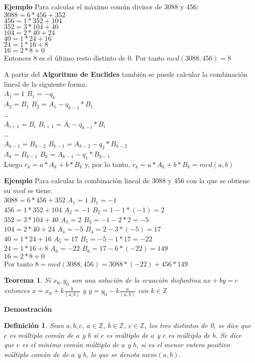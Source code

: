 \documentclass[a4paper,1pt]{report}
\newtheorem*{teo}{Teorema}
\newtheorem*{dfn}{Definición}
\begin{document}
\textbf{Ejemplo}
Para calcular el máximo común divisor de 3088 y 456:\\
$3088=6*456+352$\\
$456=1*352+104$\\
$352=3*104+40$\\
$104=2*40+24$\\
$40=1*24+16$\\
$24=1*16+8$\\
$16=2*8 + 0$\\
Entonces 8 es el último resto distinto de 0. Por tanto $mcd(3088,456)=8$

A partir del \textbf{Algoritmo de Euclides} también se puede calcular la combinación lineal de la siguiente forma:\\
$A_1=1$ $B_1=-q_k$\\
$A_2=B_1$ $B_2=A_1-q_{k-1}*B_1$\\
\dots\\
$A_{i+1}=B_i$ $B_{i+1}=A_i-q_{k-i}*B_i$\\
\dots\\
$A_{k-1}=B_{k-2}$ $B_{k-1}=A_{k-2}-q_2*B_{k-2}$\\
$A_{k}=B_{k-1}$ $B_{k}=A_{k-1}-q_1*B_{k-1}$\\
Luego $r_k=a*A_k+b*B_k$ y, por lo tanto, $r_k=a*A_k+b*B_k=mcd(a,b)$

\textbf{Ejemplo}
Para calcular la combinación lineal de 3088 y 456 con la que se obtiene su $mcd$ se tiene:\\
$3088=6*456+352$ $A_1=1$ $B_1=-1$\\
$456=1*352+104$ $A_2=-1$ $B_2=1-1*(-1)=2$\\
$352=3*104+40$ $A_3=2$ $B_3=-1-2*2=-5$\\
$104=2*40+24$ $A_4=-5$ $B_4=2-3*(-5)=17$\\
$40=1*24+16$ $A_5=17$ $B_5=-5-1*17=-22$\\
$24=1*16+8$ $A_6=-22$ $B_6=17-6*(-22)=149$\\
$16=2*8 + 0$\\
Por tanto $8=mcd(3088,456)=3088*(-22)+456*149$

\begin{teo}
 Si $x_0,y_0$ son una solución de la ecuación diofantina $ax+by=c$ entonces 
 $x=x_0+k\frac{b}{(a,b)}$ y $y=y_0-k\frac{a}{(a,b)}$ con $k\in\mathbb{Z}$
\end{teo}

\textbf{Demostración}

\begin{dfn}
 Sean $a,b,c$, $a\in\mathbb{Z}$, $b\in\mathbb{Z}$, $c\in\mathbb{Z}$, los tres distintos de 0, se dice que $c$ es múltiplo común de $a$ y $b$ si $c$ es múltiplo de $a$ y $c$ es múltiplo de $b$. Se dice que $c$ es el mínimo común múltiplo de $a$ y $b$, si es el menor entero positivo múltiplo común de de $a$ y $b$, lo que se denota $mcm(a,b)$.
\end{dfn}
\end{document}

